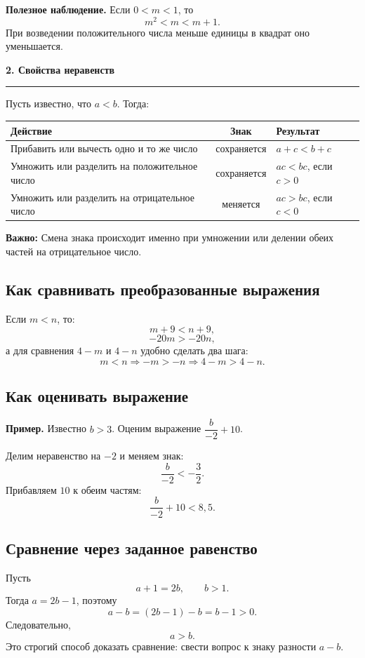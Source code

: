 \documentclass[a4paper,12pt]{article}
\newcommand{\sectiontitle}[1]{%
  \vspace{2mm}%
  {\Large\bfseries\color{darkaccent}#1}\par\vspace{1mm}%
  {\color{linegray}\hrule}\vspace{2mm}%
}
\newcommand{\key}[1]{\textbf{\color{darkaccent}#1}}
\newcommand{\warn}[1]{\textbf{\color{accent}Важно:} #1}
\begin{document}
\key{Полезное наблюдение.} Если $0<m<1$, то
\[
m^2<m<m+1.
\]
При возведении положительного числа меньше единицы в квадрат оно уменьшается.

\sectiontitle{2. Свойства неравенств}

Пусть известно, что $a<b$. Тогда:

\begin{center}
\renewcommand{\arraystretch}{1.45}
\begin{tabularx}{0.94\linewidth}{@{}XcX@{}}
\toprule
Действие & Знак & Результат \\
\midrule
Прибавить или вычесть одно и то же число & сохраняется & $a+c<b+c$ \\
Умножить или разделить на положительное число & сохраняется & $ac<bc$, если $c>0$ \\
Умножить или разделить на отрицательное число & меняется & $ac>bc$, если $c<0$ \\
\bottomrule
\end{tabularx}
\end{center}

\warn{Смена знака происходит именно при умножении или делении обеих частей на отрицательное число.}

\subsection*{Как сравнивать преобразованные выражения}
Если $m<n$, то:
\[
m+9<n+9,
\]
\[
-20m>-20n,
\]
а для сравнения $4-m$ и $4-n$ удобно сделать два шага:
\[
m<n\Rightarrow -m>-n\Rightarrow 4-m>4-n.
\]

\subsection*{Как оценивать выражение}
\textbf{Пример.} Известно $b>3$. Оценим выражение $\dfrac{b}{-2}+10$.

Делим неравенство на $-2$ и меняем знак:
\[
\frac{b}{-2}<-\frac32.
\]
Прибавляем $10$ к обеим частям:
\[
\frac{b}{-2}+10<8,5.
\]

\subsection*{Сравнение через заданное равенство}
Пусть
\[
a+1=2b,\qquad b>1.
\]
Тогда $a=2b-1$, поэтому
\[
a-b=(2b-1)-b=b-1>0.
\]
Следовательно,
\[
\boxed{a>b}.
\]
Это строгий способ доказать сравнение: свести вопрос к знаку разности $a-b$.
\end{document}
